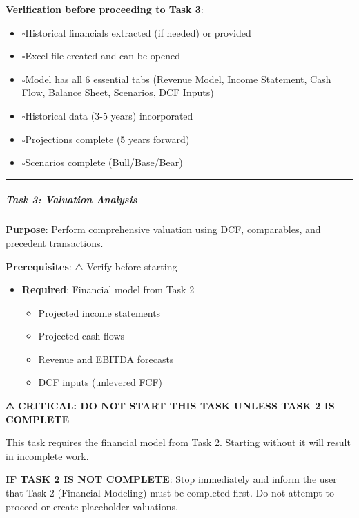 \documentclass[11pt]{article}
\newcommand{\UncheckedBox}{$\square$}
\begin{document}
\textbf{Verification before proceeding to Task 3}:

\begin{itemize}[leftmargin=*,itemsep=2pt,topsep=2pt]
\item {} \UncheckedBox Historical financials extracted (if needed) or provided
\item {} \UncheckedBox Excel file created and can be opened
\item {} \UncheckedBox Model has all 6 essential tabs (Revenue Model, Income Statement, Cash Flow, Balance Sheet, Scenarios, DCF Inputs)
\item {} \UncheckedBox Historical data (3-5 years) incorporated
\item {} \UncheckedBox Projections complete (5 years forward)
\item {} \UncheckedBox Scenarios complete (Bull/Base/Bear)
\end{itemize}

\vspace{0.5em}\hrule\vspace{0.5em}

\subparagraph{Task 3: Valuation Analysis}\mbox{}\par

\textbf{Purpose}: Perform comprehensive valuation using DCF, comparables, and precedent transactions.


\textbf{Prerequisites}: ⚠ Verify before starting

\begin{itemize}[leftmargin=*,itemsep=2pt,topsep=2pt]
\item {} \textbf{Required}: Financial model from Task 2
\begin{itemize}[leftmargin=*,itemsep=2pt,topsep=2pt]
\item {} Projected income statements
\item {} Projected cash flows
\item {} Revenue and EBITDA forecasts
\item {} DCF inputs (unlevered FCF)
\end{itemize}
\end{itemize}

\textbf{⚠ CRITICAL: DO NOT START THIS TASK UNLESS TASK 2 IS COMPLETE}


This task requires the financial model from Task 2. Starting without it will result in incomplete work.


\textbf{IF TASK 2 IS NOT COMPLETE}: Stop immediately and inform the user that Task 2 (Financial Modeling) must be completed first. Do not attempt to proceed or create placeholder valuations.
\end{document}
